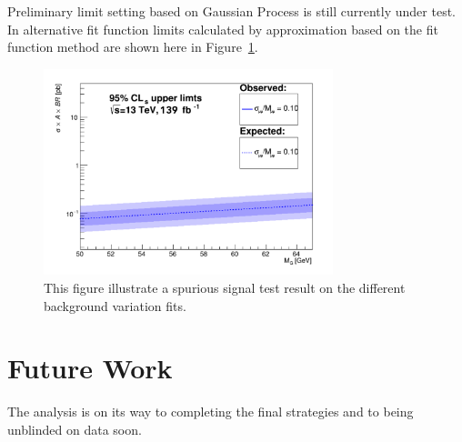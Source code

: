 Preliminary limit setting based on Gaussian Process is still currently under test. In alternative fit function limits calculated by approximation based on the fit function method are shown here in Figure~\ref{fig:limits}.

\begin{figure}[!htb]
   \begin{center}
       \includegraphics[width=0.75\textwidth]{figures/chapter_dimuon/limits}
       \caption{
       This figure illustrate a spurious signal test result on the different background variation fits.}
        \label{fig:limits}
   \end{center}
\end{figure}
\FloatBarrier

\section{Future Work}
The analysis is on its way to completing the final strategies and to being unblinded on data soon.




